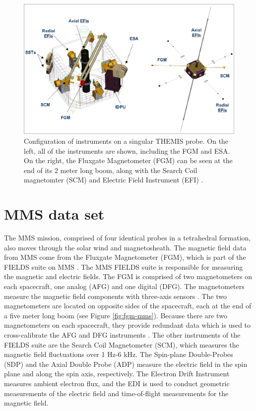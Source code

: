 \begin{figure}
    \centering
    \includegraphics[width=\textwidth]{Figures/Instrumentation/THM_diagram.jpeg}
    \caption[Configuration of instruments on a singular THEMIS probe]{Configuration of instruments on a singular THEMIS probe. On the left, all of the instruments are shown, including the FGM and ESA. On the right, the Fluxgate Magnetometer (FGM) can be seen at the end of its 2 meter long boom, along with the Search Coil magnetomter (SCM) and Electric Field Instrument (EFI) \citep{eoPortal}.}
    \label{fig:thm-diagram}
\end{figure}

\section{MMS data set}
The MMS mission, comprised of four identical probes in a tetrahedral formation, also moves through the solar wind and magnetosheath. The magnetic field data from MMS come from the Fluxgate Magnetometer (FGM), which is part of the FIELDS suite on MMS \citep{Torbert:2016}. The MMS FIELDS suite is responsible for measuring the magnetic and electric fields. The FGM is comprised of two magnetometers on each spacecraft, one analog (AFG) and one digital (DFG). The magnetometers measure the magnetic field components with three-axis sensors \citep{Torbert:2016}. The two magnetometers are located on opposite sides of the spacecraft, each at the end of a five meter long boom (see Figure \ref{fig:fgm-mms}). Because there are two magnetometers on each spacecraft, they provide redundant data which is used to cross-calibrate the AFG and DFG instruments \citep{Torbert:2016}. The other instruments of the FIELDS suite are the Search Coil Magnetometer (SCM), which measures the magnetic field fluctuations over 1 Hz-6 kHz. The Spin-plane Double-Probes (SDP) and the Axial Double Probe (ADP) measure the electric field in the spin plane and along the spin axis, respectively. The Electron Drift Instrument measures ambient electron flux, and the EDI is used to conduct geometric measurements of the electric field and time-of-flight measurements for the magnetic field.

